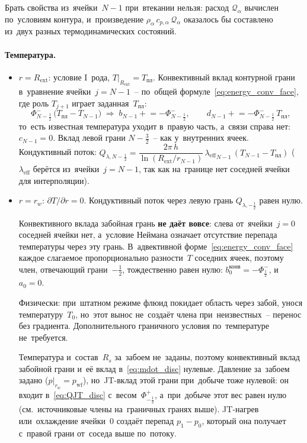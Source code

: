 \documentclass[12pt,a4paper]{article}
\newcommand{\half}{\tfrac{1}{2}}
\newcommand{\rw}{r_w}
\newcommand{\Rext}{R_{\mathrm{ext}}}
\newcommand{\pwf}{p_{\mathrm{wf}}}
\newcommand{\Tpl}{T_{\text{пл}}}
\newcommand{\leff}{\lambda_{\mathrm{eff}}}
\begin{document}
Брать свойства из~ячейки~$N-1$ при~втекании нельзя: расход
$\mathcal{Q}_\alpha$ вычислен по~условиям контура, и~произведение
$\rho_\alpha\,c_{p,\alpha}\,\mathcal{Q}_\alpha$ оказалось бы
составлено из~двух разных термодинамических состояний.

\paragraph{Температура.}
\begin{itemize}[nosep]
  \item $r = \Rext$: условие I~рода, $T\big|_{\Rext} = \Tpl$.
    Конвективный вклад контурной грани в~уравнение
    ячейки~$j = N{-}1$~-- по~общей
    формуле~\eqref{eq:energy_conv_face}, где роль $T_{j+1}$
    играет заданная~$\Tpl$:
    \[
      \Phi_{N-\half}^{-}\,\bigl(\Tpl - T_{N-1}\bigr)
      \;\Longrightarrow\;
      b_{N-1} \mathrel{+}= -\Phi_{N-\half}^{-},
      \qquad
      d_{N-1} \mathrel{+}= -\Phi_{N-\half}^{-}\,\Tpl ,
    \]
    то~есть известная температура уходит в~правую часть, а~связи
    справа нет: $c_{N-1} = 0$. Вклад левой грани $N{-}\tfrac{3}{2}$~--
    как у~внутренних ячеек.
    Кондуктивный поток:
    $Q_{\lambda,N-\half}
    = \dfrac{2\pi\,h}{\ln(\Rext/r_{N-1})}\,
    {\leff}_{N-1}\,(T_{N-1} - \Tpl)$
    (${\leff}$ берётся из~ячейки~$j = N{-}1$, так как
    на~границе нет соседней ячейки для интерполяции).
  \item $r = \rw$: $\partial T/\partial r = 0$.
    Кондуктивный поток через левую грань $Q_{\lambda,-\half}$
    равен нулю.

    Конвективного вклада забойная грань \textbf{не даёт вовсе}:
    слева от~ячейки~$j = 0$ соседней ячейки нет, а~условие Неймана
    означает отсутствие перепада температуры через эту грань.
    В~адвективной форме~\eqref{eq:energy_conv_face} каждое слагаемое
    пропорционально разности~$T$ соседних ячеек, поэтому член,
    отвечающий грани~$-\half$, тождественно равен нулю:
    $b_0^{\text{конв}} = -\Phi_{\half}^{-}$, и~$a_0 = 0$.

    Физически: при~штатном режиме флюид покидает область через забой,
    унося температуру~$T_0$, но~этот вынос не~создаёт члена
    при~неизвестных~-- перенос без градиента. Дополнительного
    граничного условия по~температуре не~требуется.

    Температура и~состав~$R_s$ за~забоем не~заданы, поэтому
    конвективный вклад забойной грани и~её вклад
    в~\eqref{eq:mdot_disc} нулевые. Давление за~забоем задано
    ($p\big|_{\rw} = \pwf$), но~JT-вклад этой грани при~добыче тоже
    нулевой: он входит в~\eqref{eq:QJT_disc} с~весом~$\Phi^{+}_{-\half}$,
    а~при~добыче этот вес равен нулю (см.~источниковые члены
    на~граничных гранях выше). JT-нагрев или~охлаждение ячейки~0
    создаёт перепад $p_1 - p_0$, который она получает с~правой грани
    от~соседа выше по~потоку.


\end{itemize}
\end{document}
